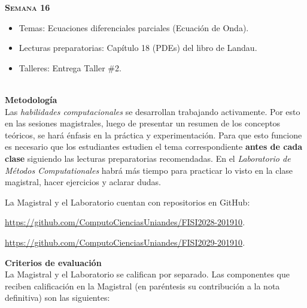 \documentclass[letterpaper,10pt,onecolumn]{article}
\begin{document}
\noindent\textbf{\textsc{Semana 16}}\\[-0.5cm]
\begin{itemize}
\item Temas: Ecuaciones diferenciales parciales (Ecuaci\'on de Onda). \\[-0.6cm]
\item Lecturas preparatorias: Cap\'itulo 18 (PDEs) del libro de
  Landau. \\[-0.6cm] 
\item Talleres: Entrega Taller \#2. \\[-0.6cm]
\\[-0.6cm]
\end{itemize}




\vspace*{0.5cm} 
\noindent\textbf{\large {} \quad
  Metodolog\'ia}\\[-0.2cm] 


\noindent\normalsize 
Las \emph{habilidades computacionales} se desarrollan trabajando activamente. 
Por esto en las sesiones magistrales, luego de presentar un resumen de
los conceptos te\'oricos, se har\'a \'enfasis en la pr\'actica y
experimentaci\'on.   
Para que esto funcione es necesario que los estudiantes estudien el
tema correspondiente {\bf antes de cada clase} siguiendo las lecturas
preparatorias recomendadas. En el \emph{Laboratorio de M\'etodos
  Computationales} habr\'a m\'as tiempo para practicar lo visto en la
clase magistral, hacer ejercicios y aclarar dudas.   

La Magistral y el Laboratorio cuentan con repositorios  en GitHub:

\url{https://github.com/ComputoCienciasUniandes/FISI2028-201910}. 

\url{https://github.com/ComputoCienciasUniandes/FISI2029-201910}. 


\vspace*{0.5cm} 
\noindent\textbf{\large {} \quad Criterios de
  evaluaci\'on}\\[-0.2cm] 

La Magistral y el Laboratorio se califican por separado. 
Las componentes que reciben calificaci\'on en la Magistral (en
par\'entesis su contribuci\'on a la nota definitiva) son las
siguientes:  
\end{document}
